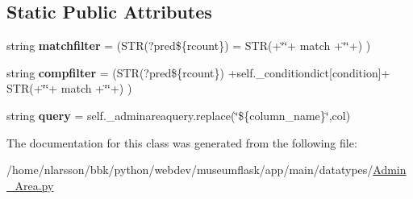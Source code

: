 \subsection*{Static Public Attributes}
\begin{DoxyCompactItemize}
\item 
\mbox{\label{classdatatypes_1_1Admin__Area_1_1Admin__Area_a10d24492669a3453cfd058a9b1751f6c}} 
string {\bfseries matchfilter} = \textquotesingle{}(S\+TR(?pred\$\{rcount\}) = S\+TR(\textquotesingle{}+\char`\"{}\textquotesingle{}\char`\"{}+ match +\char`\"{}\textquotesingle{}\char`\"{}+\textquotesingle{}) )\textquotesingle{}
\item 
\mbox{\label{classdatatypes_1_1Admin__Area_1_1Admin__Area_ac6b7c981192e6ee62aa8e543dc03862c}} 
string {\bfseries compfilter} = \textquotesingle{}(S\+TR(?pred\$\{rcount\}) \textquotesingle{}+self.\+\_\+conditiondict\mbox{[}condition\mbox{]}+\textquotesingle{} S\+TR(\textquotesingle{}+\char`\"{}\textquotesingle{}\char`\"{}+ match +\char`\"{}\textquotesingle{}\char`\"{}+\textquotesingle{}) )\textquotesingle{}
\item 
\mbox{\label{classdatatypes_1_1Admin__Area_1_1Admin__Area_a636dfc46a615789b42d7836fef84b200}} 
string {\bfseries query} = self.\+\_\+adminareaquery.\+replace(\char`\"{}\$\{column\+\_\+name\}\char`\"{},col)
\end{DoxyCompactItemize}


The documentation for this class was generated from the following file\+:\begin{DoxyCompactItemize}
\item 
/home/nlarsson/bbk/python/webdev/museumflask/app/main/datatypes/\mbox{\hyperlink{Admin__Area_8py}{Admin\+\_\+\+Area.\+py}}\end{DoxyCompactItemize}
